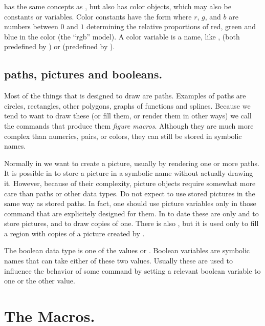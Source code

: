 \documentclass[letterpaper]{article}
\begin{document}
\CMP{} has the same concepts as \MF, but also has color objects, which
may also be constants or variables. Color constants have the form
 where $r$, $g$, and $b$ are numbers between $0$ and
$1$ determining the relative proportions of red, green and blue in the
color (the ``rgb'' model). A color variable is a name, like
,  (both predefined by \MP) or 
(predefined by \mfp{}).


\section{\CMF{} paths, pictures and booleans.}\label{paths}

Most of the things that \mfp{} is designed to draw are paths. Examples
of paths are circles, rectangles,  other polygons, graphs of
functions and splines. Because we tend to want to draw these (or fill
them, or render them in other ways) we call the \mfp{} commands that
produce them \emph{figure macros}. Although they are much more complex
than numerics, pairs, or colors, they can still be stored in symbolic
names.

Normally in \mfp{} we want to create a picture, usually by rendering one
or more paths. It is possible in \MF{} to store a picture in a symbolic
name without actually drawing it. However, because of their complexity,
picture objects require somewhat more care than paths or other data
types. Do not expect to use stored pictures in the same way as stored
paths. In fact, one should use picture variables only in those command
that are explicitely designed for them. In \mfp{} to date these are only
 and  to store pictures, and
 to draw copies of one. There is also , but it
is used only to fill a region with copies of a picture created by
.

The boolean data type is one of the values  or .
Boolean variables are symbolic names that can take either of these two
values. Usually these are used to influence the behavior of some command
by setting a relevant boolean variable to one or the other value.


\clearpage
\chapter{The Macros.}\label{macros}
\end{document}
